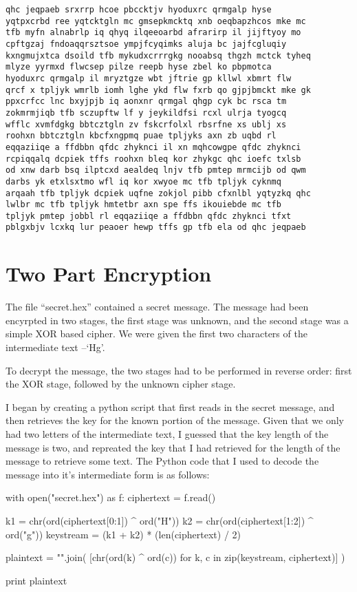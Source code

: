 \documentclass[12pt,a4paper,twoside]{article}
\begin{document}
\begin{lstlisting}
qhc jeqpaeb srxrrp hcoe pbccktjv hyoduxrc qrmgalp hyse
yqtpxcrbd ree yqtcktgln mc gmsepkmcktq xnb oeqbapzhcos mke mc
tfb myfn alnabrlp iq qhyq ilqeeoarbd afrarirp il jijftyoy mo
cpftgzaj fndoaqqrsztsoe ympjfcyqimks aluja bc jajfcgluqiy
kxngmujxtca dsoild tfb mykudxcrrrgkg nooabsq thgzh mctck tyheq
mlyze yyrmxd flwcsep pilze reepb hyse zbel ko pbpmotca
hyoduxrc qrmgalp il mryztgze wbt jftrie gp kllwl xbmrt flw
qrcf x tpljyk wmrlb iomh lghe ykd flw fxrb qo gjpjbmckt mke gk
ppxcrfcc lnc bxyjpjb iq aonxnr qrmgal qhgp cyk bc rsca tm
zokmrmjiqb tfb sczupftw lf y jeykildfsi rcxl ulrja tyogcq
wfflc xvmfdgkg bbtcztgln zv fskcrfolxl rbsrfne xs ublj xs
roohxn bbtcztgln kbcfxngpmq puae tpljyks axn zb uqbd rl
eqqaziiqe a ffdbbn qfdc zhyknci il xn mqhcowgpe qfdc zhyknci
rcpiqqalq dcpiek tffs roohxn bleq kor zhykgc qhc ioefc txlsb
od xnw darb bsq ilptcxd aealdeq lnjv tfb pmtep mrmcijb od qwm
darbs yk etxlsxtmo wfl iq kor xwyoe mc tfb tpljyk cyknmq
arqaah tfb tpljyk dcpiek uqfne zokjol pibb cfxnlbl yqtyzkq qhc
lwlbr mc tfb tpljyk hmtetbr axn spe ffs ikouiebde mc tfb
tpljyk pmtep jobbl rl eqqaziiqe a ffdbbn qfdc zhyknci tfxt
pblgxbjv lcxkq lur peaoer hewp tffs gp tfb ela od qhc jeqpaeb 
\end{lstlisting}


\section{Two Part Encryption}
The file ``secret.hex'' contained a secret message. The message had been
encyrpted in two stages, the first stage was unknown, and the second stage was
a simple XOR based cipher. We were given the first two characters of the
intermediate text --`Hg'.

To decrypt the message, the two stages had to be performed in reverse order:
first the XOR stage, followed by the unknown cipher stage. 

I began by creating a python script that first reads in the secret message, and
then retrieves the key for the known portion of the message. Given that we only
had two letters of the intermediate text, I guessed that the key length of the
message is two, and repreated the key that I had retrieved for the length of
the message to retrieve some text. The Python code that I used to decode the
message into it's intermediate form is as follows:

\begin{python}
with open("secret.hex") as f:
    ciphertext = f.read()

    k1 = chr(ord(ciphertext[0:1]) ^ ord("H"))
    k2 = chr(ord(ciphertext[1:2]) ^ ord("g"))
    keystream = (k1 + k2) * (len(ciphertext) / 2)

    plaintext = "".join(
            [chr(ord(k) ^ ord(c)) 
             for k, c in zip(keystream, ciphertext)]
    )

    print plaintext
\end{python}
\end{document}
